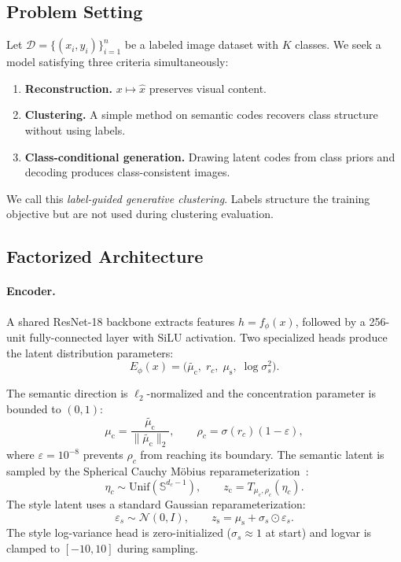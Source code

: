 \documentclass[10pt]{article}
\newcommand{\zc}{z_{\mathrm{c}}}
\newcommand{\zs}{z_{\mathrm{s}}}
\newcommand{\muc}{\mu_{\mathrm{c}}}
\newcommand{\mus}{\mu_{\mathrm{s}}}
\newcommand{\Sph}{\mathbb{S}}
\begin{document}
\subsection{Problem Setting}

Let $\mathcal{D}=\{(x_i,y_i)\}_{i=1}^{n}$ be a labeled image dataset with $K$ classes.
We seek a model satisfying three criteria simultaneously:
\begin{enumerate}[leftmargin=*]
  \item \textbf{Reconstruction.} $x\mapsto\hat{x}$ preserves visual content.
  \item \textbf{Clustering.} A simple method on semantic codes recovers class structure
        without using labels.
  \item \textbf{Class-conditional generation.} Drawing latent codes from class priors
        and decoding produces class-consistent images.
\end{enumerate}
We call this \emph{label-guided generative clustering}.
Labels structure the training objective but are not used during clustering evaluation.

\subsection{Factorized Architecture}

\paragraph{Encoder.}
A shared ResNet-18 backbone extracts features $h=f_\phi(x)$, followed by a
256-unit fully-connected layer with SiLU activation.
Two specialized heads produce the latent distribution parameters:
\begin{equation}
  E_\phi(x) = \bigl(\tilde{\muc},\;r_c,\;\mus,\;\log\sigma_s^2\bigr).
\end{equation}

The semantic direction is $\ell_2$-normalized and the concentration parameter is
bounded to $(0,1)$:
\begin{equation}
  \muc = \frac{\tilde{\muc}}{\|\tilde{\muc}\|_2},
  \qquad
  \rho_c = \sigma(r_c)(1-\varepsilon),
  \label{eq:semantic-head}
\end{equation}
where $\varepsilon=10^{-8}$ prevents $\rho_c$ from reaching its boundary.
The semantic latent is sampled by the Spherical Cauchy Möbius
reparameterization~\citep{sablica2025hyperspherical}:
\begin{equation}
  \eta_c\sim\mathrm{Unif}(\Sph^{d_c-1}),
  \qquad
  \zc = T_{\muc,\rho_c}(\eta_c).
  \label{eq:sc-reparam}
\end{equation}
The style latent uses a standard Gaussian reparameterization:
\begin{equation}
  \varepsilon_s\sim\mathcal{N}(0,I),
  \qquad
  \zs = \mus + \sigma_s \odot \varepsilon_s.
  \label{eq:style-reparam}
\end{equation}
The style log-variance head is zero-initialized ($\sigma_s\approx 1$ at start)
and logvar is clamped to $[-10, 10]$ during sampling.
\end{document}
